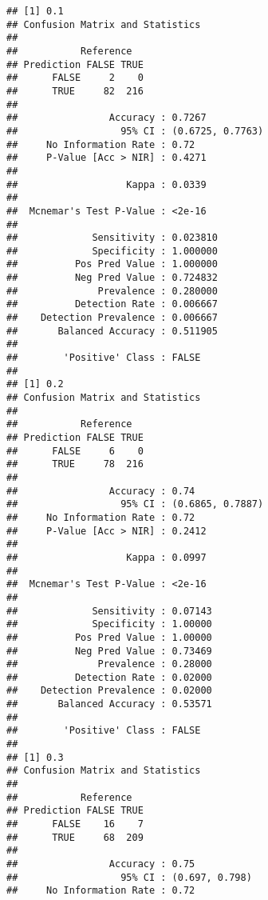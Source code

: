 \documentclass[]{article}
\begin{document}
\begin{verbatim}
## [1] 0.1
## Confusion Matrix and Statistics
## 
##           Reference
## Prediction FALSE TRUE
##      FALSE     2    0
##      TRUE     82  216
##                                           
##                Accuracy : 0.7267          
##                  95% CI : (0.6725, 0.7763)
##     No Information Rate : 0.72            
##     P-Value [Acc > NIR] : 0.4271          
##                                           
##                   Kappa : 0.0339          
##                                           
##  Mcnemar's Test P-Value : <2e-16          
##                                           
##             Sensitivity : 0.023810        
##             Specificity : 1.000000        
##          Pos Pred Value : 1.000000        
##          Neg Pred Value : 0.724832        
##              Prevalence : 0.280000        
##          Detection Rate : 0.006667        
##    Detection Prevalence : 0.006667        
##       Balanced Accuracy : 0.511905        
##                                           
##        'Positive' Class : FALSE           
##                                           
## [1] 0.2
## Confusion Matrix and Statistics
## 
##           Reference
## Prediction FALSE TRUE
##      FALSE     6    0
##      TRUE     78  216
##                                           
##                Accuracy : 0.74            
##                  95% CI : (0.6865, 0.7887)
##     No Information Rate : 0.72            
##     P-Value [Acc > NIR] : 0.2412          
##                                           
##                   Kappa : 0.0997          
##                                           
##  Mcnemar's Test P-Value : <2e-16          
##                                           
##             Sensitivity : 0.07143         
##             Specificity : 1.00000         
##          Pos Pred Value : 1.00000         
##          Neg Pred Value : 0.73469         
##              Prevalence : 0.28000         
##          Detection Rate : 0.02000         
##    Detection Prevalence : 0.02000         
##       Balanced Accuracy : 0.53571         
##                                           
##        'Positive' Class : FALSE           
##                                           
## [1] 0.3
## Confusion Matrix and Statistics
## 
##           Reference
## Prediction FALSE TRUE
##      FALSE    16    7
##      TRUE     68  209
##                                         
##                Accuracy : 0.75          
##                  95% CI : (0.697, 0.798)
##     No Information Rate : 0.72          

\end{verbatim}
\end{document}
